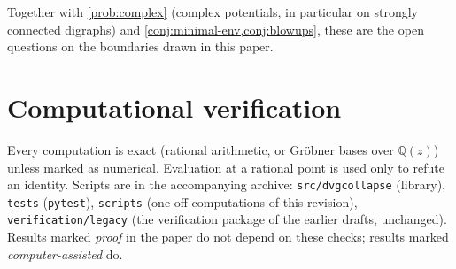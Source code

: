 \documentclass[final]{siamart0516}
\numberwithin{theorem}{section}
\numberwithin{equation}{section}
\theoremstyle{siamnonum}
\theoremstyle{plain}
\newcommand{\code}[1]{{\ttfamily\nolinkurl{#1}}}
\newcommand{\QQ}{\mathbb{Q}}
\newcommand{\Qz}{\QQ(z)}
\begin{document}
Together with \cref{prob:complex} (complex potentials, in particular on strongly connected digraphs) and \cref{conj:minimal-env,conj:blowups}, these are the open questions on the boundaries drawn in this paper.

\appendix

\section{Computational verification}\label{app:verification}

Every computation is exact (rational arithmetic, or Gr\"obner bases over $\Qz$) unless marked as numerical. Evaluation at a rational point is used only to refute an identity. Scripts are in the accompanying archive: \code{src/dvgcollapse} (library), \code{tests} (\code{pytest}), \code{scripts} (one-off computations of this revision), \code{verification/legacy} (the verification package of the earlier drafts, unchanged). Results marked \emph{proof} in the paper do not depend on these checks; results marked \emph{computer-assisted} do.
\end{document}
